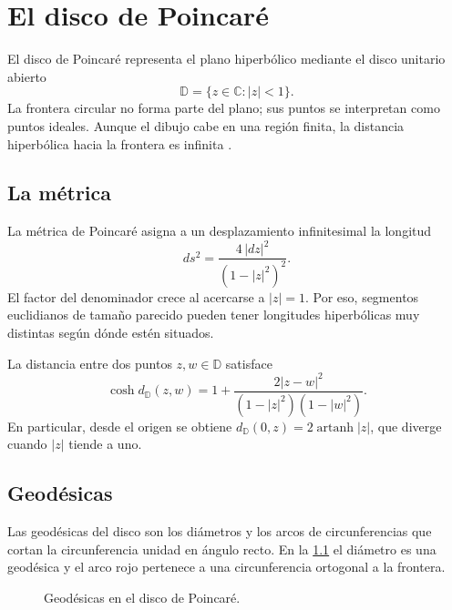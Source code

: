 \chapter{El disco de Poincaré}
\label{cap:disco-poincare}

El disco de Poincaré representa el plano hiperbólico mediante el disco unitario abierto
\[
  \mathbb{D}=\{z\in\mathbb{C}:|z|<1\}.
\]
La frontera circular no forma parte del plano; sus puntos se interpretan como puntos ideales. Aunque el dibujo cabe en una región finita, la distancia hiperbólica hacia la frontera es infinita \cite{anderson2005}.

\section{La métrica}

La métrica de Poincaré asigna a un desplazamiento infinitesimal la longitud
\begin{equation}
  ds^2=\frac{4\,|dz|^2}{(1-|z|^2)^2}.
  \label{eq:metrica-poincare}
\end{equation}
El factor del denominador crece al acercarse a \(|z|=1\). Por eso, segmentos euclidianos de tamaño parecido pueden tener longitudes hiperbólicas muy distintas según dónde estén situados.

La distancia entre dos puntos \(z,w\in\mathbb{D}\) satisface
\begin{equation}
  \cosh d_{\mathbb{D}}(z,w)
  =1+\frac{2|z-w|^2}{(1-|z|^2)(1-|w|^2)}.
  \label{eq:distancia-poincare}
\end{equation}
En particular, desde el origen se obtiene \(d_{\mathbb{D}}(0,z)=2\operatorname{artanh}|z|\), que diverge cuando \(|z|\) tiende a uno.

\section{Geodésicas}

Las geodésicas del disco son los diámetros y los arcos de circunferencias que cortan la circunferencia unidad en ángulo recto. En la \cref{fig:disco-poincare} el diámetro es una geodésica y el arco rojo pertenece a una circunferencia ortogonal a la frontera.

\begin{figure}[htbp]
  \centering
  
  \caption{Geodésicas en el disco de Poincaré.}
  \label{fig:disco-poincare}
\end{figure}

